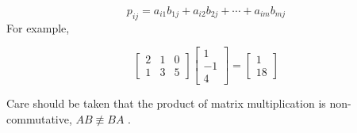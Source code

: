 \begin{equation}
	p_{ij}=a_{i1}b_{1j}+a_{i2}b_{2j}+\cdots+a_{im}b_{mj}
\end{equation}
\noindent For example,

\begin{equation}
	\begin{bmatrix}
		2&1  &0  \\
		1& 3 &5
	\end{bmatrix}
	\begin{bmatrix}
		1 \\
		-1 \\
		4
	\end{bmatrix}=
	\begin{bmatrix}
		1 \\
		18
	\end{bmatrix}
\end{equation}

\noindent Care should be taken that the product of matrix multiplication is non-commutative, $AB\not\equiv BA$ .

